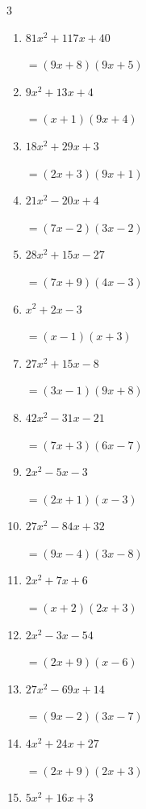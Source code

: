 \begin{multicols}{3}
\begin{enumerate}
        $=(7x-1)(2x-1)$

  \item $81x^{2}+117x+40$

        $=(9x+8)(9x+5)$

  \item $9x^{2}+13x+4$

        $=(x+1)(9x+4)$

  \item $18x^{2}+29x+3$

        $=(2x+3)(9x+1)$

  \item $21x^{2}-20x+4$

        $=(7x-2)(3x-2)$

  \item $28x^{2}+15x-27$

        $=(7x+9)(4x-3)$

\columnbreak %

  \item $x^{2}+2x-3$

        $=(x-1)(x+3)$

  \item $27x^{2}+15x-8$

        $=(3x-1)(9x+8)$

  \item $42x^{2}-31x-21$

        $=(7x+3)(6x-7)$

  \item $2x^{2}-5x-3$

        $=(2x+1)(x-3)$

  \item $27x^{2}-84x+32$

        $=(9x-4)(3x-8)$

  \item $2x^{2}+7x+6$

        $=(x+2)(2x+3)$

  \item $2x^{2}-3x-54$

        $=(2x+9)(x-6)$

  \item $27x^{2}-69x+14$

        $=(9x-2)(3x-7)$

  \item $4x^{2}+24x+27$

        $=(2x+9)(2x+3)$

  \item $5x^{2}+16x+3$


\end{enumerate}
\end{multicols}
